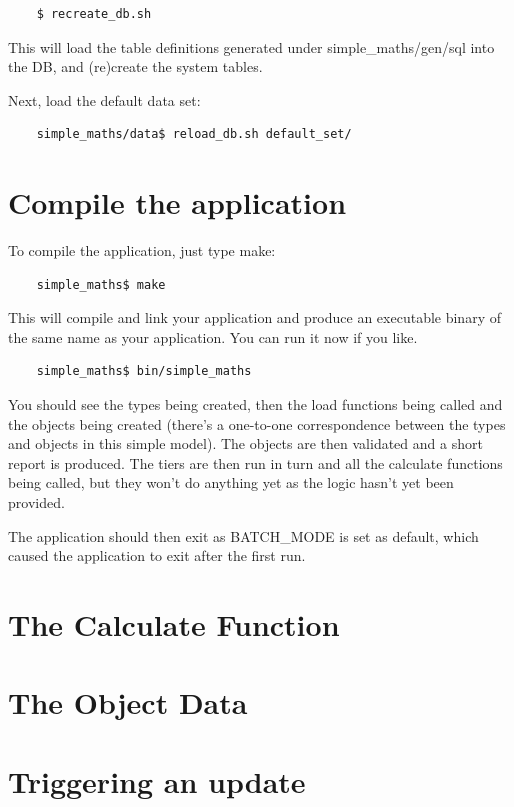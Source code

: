 \documentclass{report}
\begin{document}
\begin{verbatim}
    $ recreate_db.sh
\end{verbatim}

This will load the table definitions generated under simple_maths/gen/sql into the DB, and (re)create the 
system tables.

Next, load the default data set:

\begin{verbatim}
    simple_maths/data$ reload_db.sh default_set/
\end{verbatim}

\section{Compile the application}

To compile the application, just type make:

\begin{verbatim}
    simple_maths$ make
\end{verbatim}

This will compile and link your application and produce an executable binary of the same name as your 
application. You can run it now if you like. 

\begin{verbatim}
    simple_maths$ bin/simple_maths
\end{verbatim}

You should see the types being created, then the load functions being called and the objects being created (there's a one-to-one correspondence between the types and objects in this simple model). The objects are then validated and a short report is produced. The tiers are then run in turn and all the calculate functions being called, but they won't do anything yet as the logic hasn't yet been provided.

The application should then exit as BATCH_MODE is set as default, which caused the application to exit after the first run.

\section{The Calculate Function}

\section{The Object Data}

\section{Triggering an update}
\end{document}
